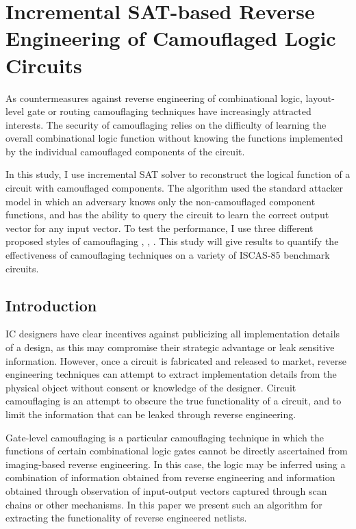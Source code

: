 \documentclass[proposal]{umassthesis}  %
\begin{document}
\chapter{Incremental SAT-based Reverse Engineering of Camouflaged Logic Circuits}
        As countermeasures against reverse engineering of combinational logic, layout-level gate or routing camouflaging techniques have increasingly attracted interests. The security of camouflaging relies on the difficulty of learning the overall combinational logic function without knowing the functions implemented by the individual camouflaged components of the circuit.

        In this study, I use incremental SAT solver to reconstruct the logical function of a circuit with camouflaged components. The algorithm used the standard attacker model in which an adversary knows only the non-camouflaged component functions, and has the ability to query the circuit to learn the correct output vector for any input vector. To test the performance, I use three different proposed styles of camouflaging \cite{1}, \cite{2}, \cite{3}. This study will give results to quantify the effectiveness of camouflaging techniques on a variety of ISCAS-85 benchmark circuits.
\section{Introduction}
    IC designers have clear incentives against publicizing all implementation details of a design, as this may compromise their strategic advantage or leak sensitive information. However, once a circuit is fabricated and released to market, reverse engineering techniques can attempt to extract implementation details from the physical object without consent or knowledge of the designer. Circuit camouflaging is an attempt to obscure the true functionality of a circuit, and to limit the information that can be leaked through reverse engineering.
    
    Gate-level camouflaging is a particular camouflaging technique in which the functions of certain combinational logic gates cannot be directly ascertained from imaging-based reverse engineering. In this case, the logic may be inferred using a combination of information obtained from reverse engineering and information obtained through observation of input-output vectors captured through scan chains or other mechanisms. In this paper we present such an algorithm for extracting the functionality of reverse engineered netlists.
\end{document}

